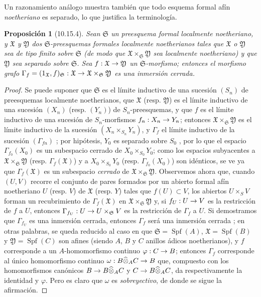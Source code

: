\documentclass[oneside]{amsart}
\theoremstyle{ega-env-style}
\theoremstyle{ega-thm-env-style}
\newtheorem*{proposition}{Proposición}
\theoremstyle{ega-defn-env-style}
\renewcommand{\to}{\mathchoice{\longrightarrow}{\rightarrow}{\rightarrow}{\rightarrow}}
\let\EGAOriginalLabel\label
\renewcommand{\label}[1]{\phantomsection\EGAOriginalLabel{#1}}
\begin{document}
Un razonamiento análogo muestra también que todo esquema formal afín \emph{noetheriano} es separado, lo que justifica la terminología.

\begin{proposition}[10.15.4]
\label{I.10.15.4}
Sean $\mathfrak{S}$ un preesquema formal localmente noetheriano, y $\mathfrak{X}$ y $\mathfrak{Y}$ dos $\mathfrak{S}$-preesquemas formales localmente noetherianos tales que $\mathfrak{X}$ o $\mathfrak{Y}$ sea de tipo finito sobre $\mathfrak{S}$ (de modo que $\mathfrak{X}\times_{\mathfrak{S}}\mathfrak{Y}$ sea localmente noetheriano) y que $\mathfrak{Y}$ sea separado sobre $\mathfrak{S}$.
Sea $f:\mathfrak{X}\to\mathfrak{Y}$ un $\mathfrak{S}$-morfismo; entonces el morfismo grafo $\Gamma_f=(1_{\mathfrak{X}},f)_{\mathfrak{S}}:\mathfrak{X}\to
\mathfrak{X}\times_{\mathfrak{S}}\mathfrak{Y}$ es una inmersión cerrada.
\end{proposition}

\begin{proof}
Se puede suponer que $\mathfrak{S}$ es el límite inductivo de una sucesión $(S_n)$ de preesquemas localmente noetherianos, que $\mathfrak{X}$ (resp. $\mathfrak{Y}$) es el límite inductivo de una sucesión $(X_n)$ (resp. $(Y_n)$) de $S_n$-preesquemas, y que $f$ es el límite inductivo de una sucesión de $S_n$-morfismos $f_n:X_n\to Y_n$;
entonces $\mathfrak{X}\times_{\mathfrak{S}}\mathfrak{Y}$ es el límite inductivo de la sucesión $(X_n\times_{S_n}Y_n)$, y $\Gamma_f$ el límite inductivo de la sucesión $(\Gamma_{fn})$ ;
por hipótesis, $Y_0$ es separado sobre $S_0$ , por lo que el espacio $\Gamma_{f_0}(X_0)$ es un subespacio cerrado de $X_0\times_{S_0}Y_0$;
como los espacios subyacentes a $\mathfrak{X}\times_{\mathfrak{S}}\mathfrak{Y}$ (resp. $\Gamma_f(\mathfrak{X})$) y a $X_0\times_{S_0}Y_0$ (resp. $\Gamma_{f_0}(X_0)$) son idénticos, se ve ya que $\Gamma_f(\mathfrak{X})$ es un subespacio \emph{cerrado} de $\mathfrak{X}\times_{\mathfrak{S}}\mathfrak{Y}$.
Observemos ahora que, cuando $(U,V)$ recorre el conjunto de pares formados por un abierto formal afín noetheriano $U$ (resp. $V$) de $\mathfrak{X}$ (resp. $Y$) tales que $f(U)\subset V$, los abiertos $U\times_{S}V$ forman un recubrimiento de $\Gamma_f(\mathfrak{X})$ en $\mathfrak{X}\times_{\mathfrak{S}}\mathfrak{Y}$ y, si $f_U:U\to V$ es la restricción de $f$ a $U$, entonces $\Gamma_{f_U}:U\to U\times_{\mathfrak{S}}V$ es la restricción de $\Gamma_f$ a $U$.
Si demostramos que $\Gamma_{f_U}$ es una inmersión cerrada, entonces $\Gamma_f$ será una inmersión cerrada ; en otras palabras, se queda reducido al caso en que $\mathfrak{S}=\operatorname{Spf}(A)$, $\mathfrak{X}=\operatorname{Spf}(B)$ y $\mathfrak{Y}=\operatorname{Spf}(C)$ son afines (siendo $A$, $B$ y $C$ anillos ádicos noetherianos), y $f$ corresponde a un $A$-homomorfismo continuo $\varphi:C\to B$;
entonces $\Gamma_f$ corresponde al único homomorfismo continuo $\omega:B\widehat{\otimes}_A C\to B$ que, compuesto con los homomorfismos canónicos $B\to B\widehat{\otimes}_A C$ y $C\to B\widehat{\otimes}_A C$, da respectivamente la identidad y $\varphi$.
Pero es claro que $\omega$ es \emph{sobreyectivo}, de donde se sigue la afirmación.
\end{proof}
\end{document}
